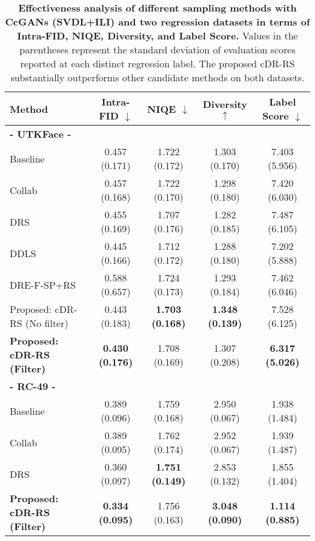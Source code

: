 \documentclass[final,12pt, 3p,times]{elsarticle}
\begin{document}
\begin{table}[htbp]
	\centering
	\caption{\textbf{Effectiveness analysis of different sampling methods with CcGANs (SVDL+ILI) and two regression datasets in terms of Intra-FID, NIQE, Diversity, and Label Score.} Values in the parentheses represent the standard deviation of evaluation scores reported at each distinct regression label. The proposed cDR-RS substantially outperforms other candidate methods on both datasets.}
\begin{adjustbox}{width=0.75\textwidth}
		\begin{tabular}{lcccc}
			\toprule
			\textbf{Method} & \textbf{Intra-FID} $\downarrow$ & \textbf{NIQE} $\downarrow$ & \textbf{Diversity} $\uparrow$ & \textbf{Label Score} $\downarrow$ \\
			\midrule
			\textbf{- UTKFace -} &  &  &  &  \\
			Baseline & 0.457 (0.171) & 1.722 (0.172) & 1.303 (0.170) & 7.403 (5.956) \\
			Collab \cite{liu2020collaborative} & 0.457 (0.168) & 1.722 (0.170) & 1.298 (0.180) & 7.420 (6.030) \\
			DRS \cite{azadi2018discriminator} & 0.455 (0.169) & 1.707 (0.176) & 1.282 (0.185) & 7.487 (6.105) \\
			DDLS \cite{che2020your} & 0.445 (0.166) & 1.712 (0.172)  & 1.288 (0.180) & 7.202 (5.888) \\
			DRE-F-SP+RS \cite{ding2020subsampling} & 0.588 (0.657) & 1.724 (0.173) & 1.293 (0.184) & 7.462 (6.046) \\
			\hdashline
			Proposed: cDR-RS (No filter) & 0.443 (0.183) & \textbf{1.703 (0.168)} & \textbf{1.348 (0.139)} & 7.528 (6.125) \\
			\textbf{Proposed: cDR-RS (Filter)} & \textbf{0.430 (0.176)} & 1.708 (0.169) & 1.307 (0.208) & \textbf{6.317 (5.026)} \\
			\midrule
			\textbf{- RC-49 -} &  &  &  &  \\
			Baseline & 0.389 (0.096) & 1.759 (0.168) & 2.950 (0.067) & 1.938 (1.484) \\
			Collab \cite{liu2020collaborative} & 0.389 (0.095) & 1.762 (0.174) & 2.952 (0.067) & 1.939 (1.487) \\
			DRS \cite{azadi2018discriminator} & 0.360 (0.097) & \textbf{1.751 (0.149)} & 2.853 (0.132) & 1.855 (1.404) \\
\hdashline
			\textbf{Proposed: cDR-RS (Filter)} & \textbf{0.334 (0.095)} & 1.756 (0.163) & \textbf{3.048 (0.090)} & \textbf{1.114 (0.885)} \\
			\bottomrule
		\end{tabular}\end{adjustbox}
	\label{tab:effectiveness_analysis_regression}\end{table}
\end{document}
